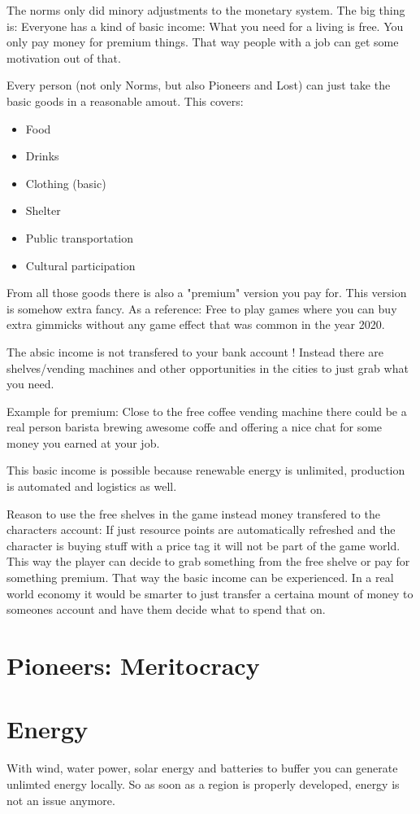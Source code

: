 The norms only did minory adjustments to the monetary system. The big thing is: Everyone has a kind of basic income: What you need for a living is free.
You only pay money for premium things. That way people with a job can get some motivation out of that.

Every person (not only Norms, but also Pioneers and Lost) can just take the basic goods in a reasonable amout. This covers:

\begin{itemize}
    \item Food
    \item Drinks
    \item Clothing (basic)
    \item Shelter
    \item Public transportation
    \item Cultural participation
\end{itemize}

From all those goods there is also a "premium" version you pay for. This version is somehow extra fancy. As a reference: Free to play games where you can buy extra gimmicks without any game effect that was common in the year 2020.

The absic income is not transfered to your bank account ! Instead there are shelves/vending machines and other opportunities in the cities to just grab what you need.

Example for premium: Close to the free coffee vending machine there could be a real person barista brewing awesome coffe and offering a nice chat for some money you earned at your job.

This basic income is possible because renewable energy is unlimited, production is automated and logistics as well.

\begin{reason}[]
    Reason to use the free shelves in the game instead money transfered to the characters account: If just resource points are automatically refreshed and the character is buying stuff with a price tag it will not be part of the game world. This way the player can decide to grab something from the free shelve or pay for something premium. That way the basic income can be experienced. In a real world economy it would be smarter to just transfer a certaina mount of money to someones account and have them decide what to spend that on.
\end{reason}

\section{Pioneers: Meritocracy}
\label{sec:meritocracy}


\section{Energy}

With wind, water power, solar energy and batteries to buffer you can generate unlimted energy locally. So as soon as a region is properly developed, energy is not an issue anymore.
